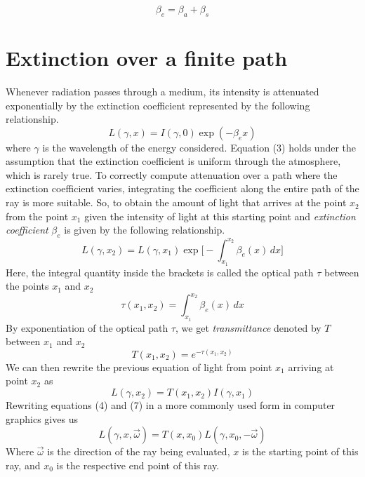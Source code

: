 \documentclass{ctuthesis}
\begin{document}
\begin{equation}
    \beta_{e} = \beta_{a} + \beta_{s} 
\end{equation}

\section{Extinction over a finite path}
\label{extinction over a finite path}

Whenever radiation passes through a medium, its intensity is attenuated exponentially by the 
extinction coefficient represented by the following relationship.
\begin{equation}
    L(\gamma, x) = I(\gamma , 0) \exp(-\beta_{e} x)
\end{equation}
where $\gamma$ is the wavelength of the energy considered. Equation (3) holds under the
assumption that the extinction coefficient is uniform through the atmosphere, which is rarely true. 
To correctly compute attenuation over a path where the extinction coefficient varies, integrating the
coefficient along the entire path of the ray is more suitable. So, to obtain the amount of light that arrives at
the point $x_{2}$ from the point $x_{1}$ given the intensity of light at this starting point and 
\textit{extinction coefficient} $\beta_{e}$ is given by the following relationship.
\begin{equation}
    L(\gamma, x_{2}) = L(\gamma, x_{1}) \exp \bigg[ -\int_{x_{1}}^{x_{2}} \beta_{e}(x) \,dx \bigg]
\end{equation}
Here, the integral quantity inside the brackets is called the optical path 
$\tau$ between the points $x_{1}$ and $x_{2}$
\begin{equation}
    \tau (x_{1},x_{2}) = \int_{x_{1}}^{x_{2}} \beta_{e}(x) \,dx
\end{equation}
By exponentiation of the optical path $\tau$, we get \textit{transmittance} denoted by $T$
between $x_{1}$ and $x_{2}$
\begin{equation}
\label{eq:transmittance}
    T(x_{1},x_{2}) = e^{-\tau(x_{1},x_{2})}
\end{equation}
We can then rewrite the previous equation of light from point $x_{1}$ arriving at point $x_{2}$ as 
\begin{equation}
    L(\gamma ,x_{2}) = T(x_{1}, x_{2})I(\gamma,x_{1})
\end{equation}
Rewriting equations (4) and (7) in a more commonly used form in computer graphics gives us 
\begin{equation}
\label{eq:direct light contribution}
    L(\gamma, x, \overrightarrow{\omega}) = T(x, x_{0}) L(\gamma ,x_{0}, -\overrightarrow{\omega})
\end{equation}
Where $\overrightarrow{\omega}$ is the direction of the ray being evaluated, $x$ is 
the starting point of this ray, and $x_{0}$ is the respective end point of this ray.
\end{document}
